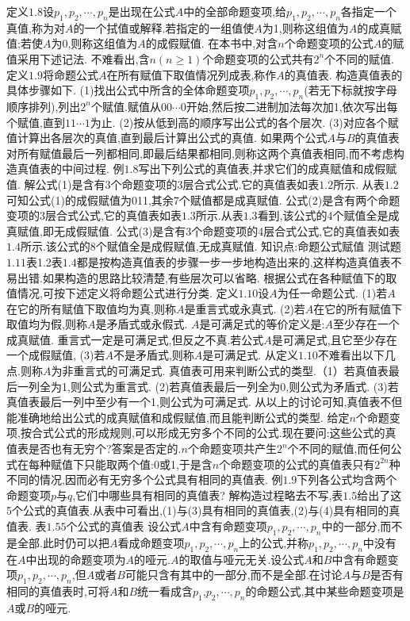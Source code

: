 {定义$1.8$设$p_{1},p_{2},\cdots,p_{n}$是出现在公式$A$中的全部命题变项,给$p_{1},p_{2},\cdots,p_{n}$各指定一个真值,称为对$A$的一个拭值或解释.若指定的一组值使$A$为1,则称这组值为$A$的成真赋值;若使$A$为0,则称这组值为$A$的成假赋值.
在本书中,对含$n$个命题变项的公式$A$的赋值采用下述记法.
不难看出,含$n(n\geqslant1)$个命题变项的公式共有$2^{n}$个不同的赋值.
定义$1.9$将命题公式$A$在所有赋值下取值情况列成表,称作$A$的真值表.
构造真值表的具体步骤如下.
(1)找出公式中所含的全体命题变项$p_{1},p_{2},\cdots,p_{n}$(若无下标就按字母顺序排列),列出$2^{n}$个赋值.赋值从$00\cdots0$开始,然后按二进制加法每次加1,依次写出每个赋值,直到$11\cdots1$为止.
(2)按从低到高的顺序写出公式的各个层次.
(3)对应各个赋值计算出各层次的真值,直到最后计算出公式的真值.
如果两个公式$A$与$B$的真值表对所有赋值最后一列都相同,即最后结果都相同,则称这两个真值表相同,而不考虑构造真值表的中间过程.
例$1.8$写出下列公式的真值表,并求它们的成真赋值和成假赋值.
解公式(1)是含有3个命题变项的3层合式公式.它的真值表如表$1.2$所示.
从表$1.2$可知公式(1)的成假赋值为011,其余7个赋值都是成真赋值.
公式(2)是含有两个命题变项的3层合式公式,它的真值表如表$1.3$所示.从表$1.3$看到,该公式的4个赋值全是成真赋值,即无成假赋值.
公式(3)是含有3个命题变项的4层合式公式,它的真值表如表$1.4$所示.该公式的8个赋值全是成假赋值,无成真赋值.
知识点:命题公式赋值
测试题$1.11$表1.2表$1.4$都是按构造真值表的步骤一步一步地构造出来的,这样构造真值表不易出错.如果构造的思路比较清楚,有些层次可以省略.
根据公式在各种赋值下的取值情况,可按下述定义将命题公式进行分类.
定义$\mathbf{1.10}$设$A$为任一命题公式.
(1)若$A$在它的所有赋值下取值均为真,则称$A$是重言式或永真式.
(2)若$A$在它的所有赋值下取值均为假,则称$A$是矛盾式或永假式.
$A$是可满足式的等价定义是:$A$至少存在一个成真赋值.
重言式一定是可满足式,但反之不真.若公式$A$是可满足式,且它至少存在一个成假赋值,
(3)若$A$不是矛盾式,则称$A$是可满足式.
从定义$1.10$不难看出以下几点.则称$A$为非重言式的可满足式.
真值表可用来判断公式的类型.（1）若真值表最后一列全为1,则公式为重言式.
(2)若真值表最后一列全为0,则公式为矛盾式.
(3)若真值表最后一列中至少有一个1,则公式为可满足式.
从以上的讨论可知,真值表不但能准确地给出公式的成真赋值和成假赋值,而且能判断公式的类型.
给定$n$个命题变项,按合式公式的形成规则,可以形成无穷多个不同的公式.现在要问:这些公式的真值表是否也有无穷个?答案是否定的.$n$个命题变项共产生$2^{n}$个不同的赋值,而任何公式在每种赋值下只能取两个值:0或1,于是含$n$个命题变项的公式的真值表只有$2^{2n}$种不同的情况,因而必有无穷多个公式具有相同的真值表.
例$1.9$下列各公式均含两个命题变项$p$与$q$,它们中哪些具有相同的真值表?
解构造过程略去不写,表$1.5$给出了这5个公式的真值表.从表中可看出,(1)与(3)具有相同的真值表,(2)与(4)具有相同的真值表.
表$1.55$个公式的真值表
设公式$A$中含有命题变项$p_{1},p_{2},\cdots,p_{n}$中的一部分,而不是全部.此时仍可以把$A$看成命题变项$p_{1},p_{2},\cdots,p_{n}$上的公式,并称$p_{1},p_{2},\cdots,p_{n}$中没有在$A$中出现的命题变项为$A$的哑元.$A$的取值与哑元无关.设公式$A$和$B$中含有命题变项$p_{1},p_{2},\cdots,p_{n}$,但$A$或者$B$可能只含有其中的一部分,而不是全部.在讨论$A$与$B$是否有相同的真值表时,可将$A$和$B$统一看成含$p_{1}$,$p_{2},\cdots,p_{n}$的命题公式,其中某些命题变项是$A$或$B$的哑元.
}
